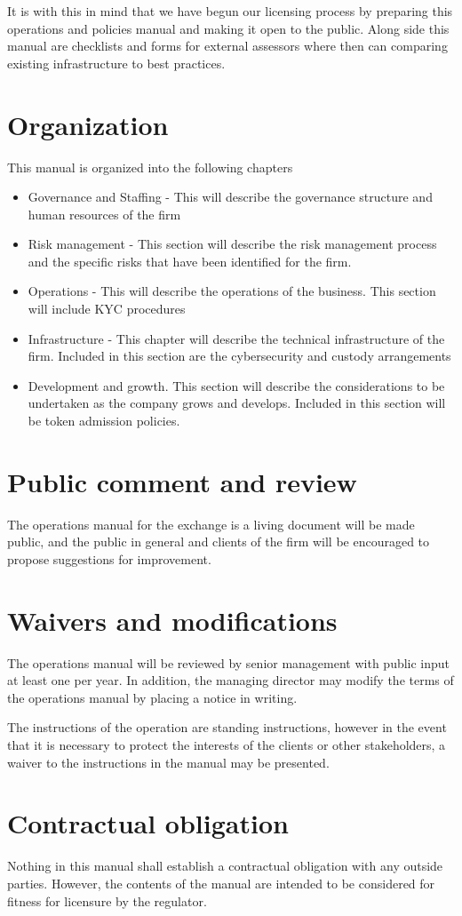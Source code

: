 It is with this in mind that we have begun our licensing process by
preparing this operations and policies manual and making it open to
the public.  Along side this manual are checklists and forms for
external assessors where then can comparing existing infrastructure to
best practices.

\section{Organization}

This manual is organized into the following chapters

\begin{itemize}
  \item Governance and Staffing - This will describe the governance
    structure and human resources of the firm
  \item Risk management - This section will describe the risk
    management process and the specific risks that have been
    identified for the firm.
  \item Operations - This will describe the operations of the
    business.  This section will include KYC procedures
  \item Infrastructure - This chapter will describe the technical
    infrastructure of the firm.  Included in this section are the
    cybersecurity and custody arrangements
  \item Development and growth.  This section will describe the
    considerations to be undertaken as the company grows and develops.
    Included in this section will be token admission policies.
\end{itemize}

\section{Public comment and review}
The operations manual for the exchange is a living document will be
made public, and the public in general and clients of the firm will be
encouraged to propose suggestions for improvement.

\section{Waivers and modifications}
The operations manual will be reviewed by senior management with
public input at least one per year.  In addition, the managing
director may modify the terms of the operations manual by placing a
notice in writing.

The instructions of the operation are standing instructions, however
in the event that it is necessary to protect the interests of the
clients or other stakeholders, a waiver to the instructions in the
manual may be presented.

\section{Contractual obligation}
Nothing in this manual shall establish a contractual obligation with
any outside parties.  However, the contents of the manual are intended
to be considered for fitness for licensure by the regulator.
